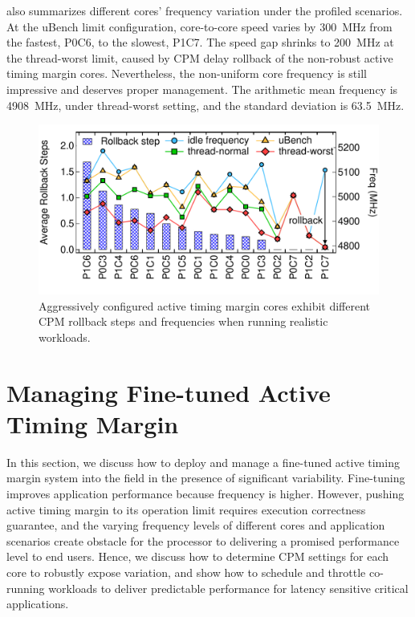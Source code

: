  also summarizes different cores' frequency variation under the profiled scenarios. At the uBench limit configuration, core-to-core speed varies by 300~MHz from the fastest, P0C6, to the slowest, P1C7. The speed gap shrinks to 200~MHz at the thread-worst limit, caused by CPM delay rollback of the non-robust active timing margin cores. Nevertheless, the non-uniform core frequency is still impressive and deserves proper management. The arithmetic mean frequency is 4908~MHz, under thread-worst setting, and the standard deviation is 63.5~MHz.


\begin{figure}[t]
  \centering
  \includegraphics[trim=0 20 0 20,clip,width=\linewidth]{graphs/process//spec-rollback.pdf}
  \caption{Aggressively configured active timing margin cores exhibit different CPM rollback steps and frequencies when running realistic workloads.}
  \label{fig:core-cpm-var}
\end{figure}

\section{Managing Fine-tuned Active Timing Margin}
\label{sec:process:schedule}

In this section, we discuss how to deploy and manage a fine-tuned active timing margin system into the field in the presence of significant variability. Fine-tuning improves application performance because frequency is higher. However, pushing active timing margin to its operation limit requires execution correctness guarantee, and the varying frequency levels of different cores and application scenarios create obstacle for the processor to delivering a promised performance level to end users. Hence, we discuss how to determine CPM settings for each core to robustly expose variation, and show how to schedule and throttle co-running workloads to deliver predictable performance for latency sensitive critical applications.

